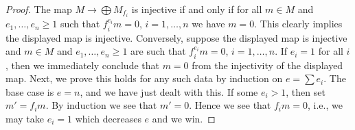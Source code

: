 \documentclass[10pt,a4paper]{amsart}
\theoremstyle{plain}
\theoremstyle{definition}
\theoremstyle{remark}
\numberwithin{equation}{subsection}
\begin{document}
\begin{proof}
The map $M \to \bigoplus M_{f_i}$ is injective if and only if
for all $m \in M$ and $e_1, \ldots, e_n \geq 1$ such that
$f_i^{e_i}m = 0$, $i = 1, \ldots, n$ we have $m = 0$.
This clearly implies the displayed map is injective.
Conversely, suppose the displayed map is injective and
$m \in M$ and $e_1, \ldots, e_n \geq 1$ are such that
$f_i^{e_i}m = 0$, $i = 1, \ldots, n$. If $e_i = 1$ for all $i$,
then we immediately conclude that $m = 0$ from the injectivity of
the displayed map. Next, we prove this holds for any such data
by induction on $e = \sum e_i$. The base case is $e = n$, and we have
just dealt with this. If some $e_i > 1$, then set $m' = f_im$.
By induction we see that $m' = 0$. Hence we see that $f_i m = 0$,
i.e., we may take $e_i = 1$ which decreases $e$ and we win.
\end{proof}
\end{document}
